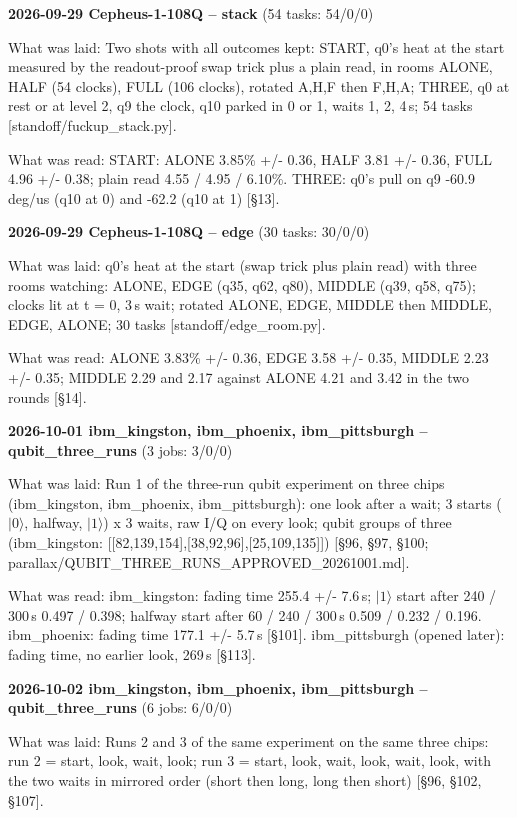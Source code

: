 \documentclass[11pt]{article}
\begin{document}
\textbf{2026-09-29 Cepheus-1-108Q -- stack} (54 tasks: 54/0/0)

What was laid: Two shots with all outcomes kept: START, q0's heat at the start measured by the readout-proof swap trick plus a plain read, in rooms ALONE, HALF (54 clocks), FULL (106 clocks), rotated A,H,F then F,H,A; THREE, q0 at rest or at level 2, q9 the clock, q10 parked in 0 or 1, waits 1, 2, 4\,\textmu s; 54 tasks {[}standoff/fuckup\_stack.py{]}.

What was read: START: ALONE 3.85\% +/- 0.36, HALF 3.81 +/- 0.36, FULL 4.96 +/- 0.38; plain read 4.55 / 4.95 / 6.10\%. THREE: q0's pull on q9 -60.9 deg/us (q10 at 0) and -62.2 (q10 at 1) {[}\S{}13{]}.

\textbf{2026-09-29 Cepheus-1-108Q -- edge} (30 tasks: 30/0/0)

What was laid: q0's heat at the start (swap trick plus plain read) with three rooms watching: ALONE, EDGE (q35, q62, q80), MIDDLE (q39, q58, q75); clocks lit at t = 0, 3\,\textmu s wait; rotated ALONE, EDGE, MIDDLE then MIDDLE, EDGE, ALONE; 30 tasks {[}standoff/edge\_room.py{]}.

What was read: ALONE 3.83\% +/- 0.36, EDGE 3.58 +/- 0.35, MIDDLE 2.23 +/- 0.35; MIDDLE 2.29 and 2.17 against ALONE 4.21 and 3.42 in the two rounds {[}\S{}14{]}.

\textbf{2026-10-01 ibm\_kingston, ibm\_phoenix, ibm\_pittsburgh -- qubit\_three\_runs} (3 jobs: 3/0/0)

What was laid: Run 1 of the three-run qubit experiment on three chips (ibm\_kingston, ibm\_phoenix, ibm\_pittsburgh): one look after a wait; 3 starts (\(|0\rangle\), halfway, \(|1\rangle\)) x 3 waits, raw I/Q on every look; qubit groups of three (ibm\_kingston: {[}{[}82,139,154{]},{[}38,92,96{]},{[}25,109,135{]}{]}) {[}\S{}96, \S{}97, \S{}100; parallax/QUBIT\_THREE\_RUNS\_APPROVED\_20261001.md{]}.

What was read: ibm\_kingston: fading time 255.4 +/- 7.6\,\textmu s; \(|1\rangle\) start after 240 / 300\,\textmu s 0.497 / 0.398; halfway start after 60 / 240 / 300\,\textmu s 0.509 / 0.232 / 0.196. ibm\_phoenix: fading time 177.1 +/- 5.7\,\textmu s {[}\S{}101{]}. ibm\_pittsburgh (opened later): fading time, no earlier look, 269\,\textmu s {[}\S{}113{]}.

\textbf{2026-10-02 ibm\_kingston, ibm\_phoenix, ibm\_pittsburgh -- qubit\_three\_runs} (6 jobs: 6/0/0)

What was laid: Runs 2 and 3 of the same experiment on the same three chips: run 2 = start, look, wait, look; run 3 = start, look, wait, look, wait, look, with the two waits in mirrored order (short then long, long then short) {[}\S{}96, \S{}102, \S{}107{]}.
\end{document}
